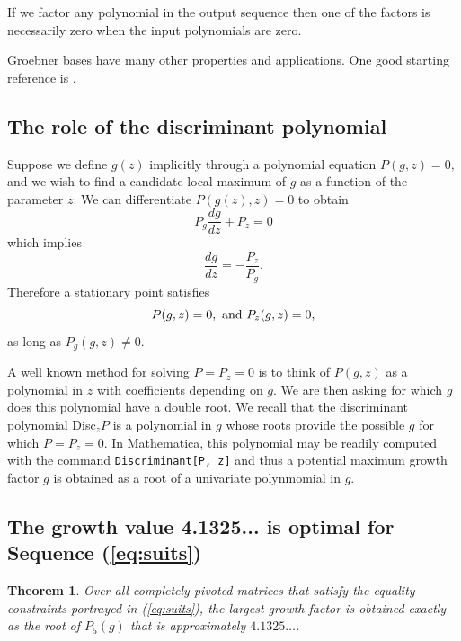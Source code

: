 \documentclass[reqno]{amsart}
\numberwithin{equation}{section}
\newtheorem{theorem}{Theorem}[section]
\begin{document}
If we factor any polynomial in the output sequence
then one of the factors is necessarily zero when the input polynomials are zero.

Groebner bases have many other properties and
applications.  One good starting reference is \cite{sturmfels2005grobner}.


\subsection{The role of the discriminant polynomial}
\label{sec:disc}

Suppose we define $g(z)$ implicitly through a polynomial equation 
$P(g,z)=0,$ and we wish to find a candidate local maximum of $g$
as a function of the parameter $z$.  
We can differentiate $P(g(z),z)=0$ to obtain
$$P_g  \frac{dg}{dz}  + P_z =0$$ which implies
$$ \frac{dg}{dz} = - \frac{P_z }{ P_g}.$$
Therefore a stationary point satisfies
$$ P(g,z)=0, \ {\rm and} \ P_z(g,z)=0,$$
as long as $ P_g(g,z) \ne 0.$

A well known method for solving $P=P_z=0$ is to think of $P(g,z)$
as a polynomial in $z$ with coefficients depending on $g$.
We are then asking for which $g$ does this polynomial have a double root.
We recall that the  discriminant polynomial
Disc$_z P$ is a polynomial in $g$ whose roots provide 
the possible $g$ for which $P=P_z=0.$
In Mathematica, this polynomial may be readily computed with the command
\verb+Discriminant[P, z]+ and thus a potential maximum growth factor $g$
is obtained as a root of a univariate polynmomial in $g$. 



\subsection{ 
The growth value 4.1325... is optimal
 for  Sequence (\ref{eq:suits})
}\label{sub:local_max}

\begin{theorem}\label{thm_n=5}
Over all completely pivoted matrices that satisfy the equality constraints portrayed in (\ref{eq:suits}), the largest growth factor is obtained exactly as the
root of $P_5(g)$ that is approximately
$4.1325\dots$.
\end{theorem}
\end{document}
